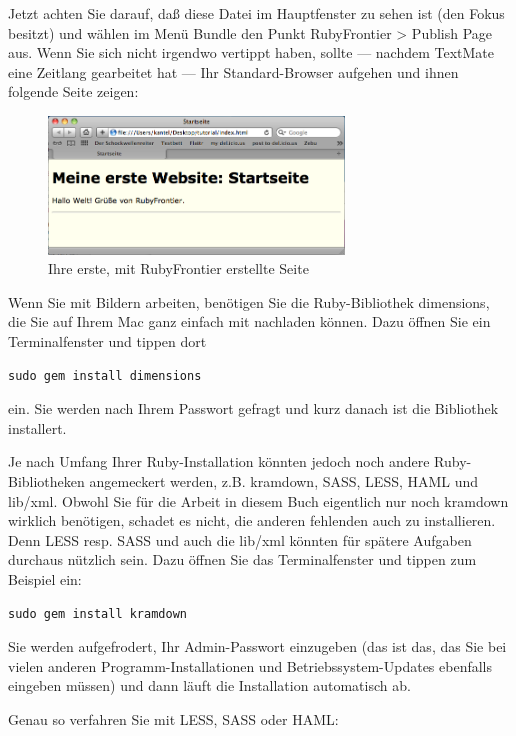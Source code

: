 \documentclass[11pt]{report}
\begin{document}
Jetzt achten Sie darauf, daß diese Datei im Hauptfenster zu sehen ist
(den Fokus besitzt) und wählen im Menü Bundle den Punkt RubyFrontier >
Publish Page aus. Wenn Sie sich nicht irgendwo vertippt haben, sollte
— nachdem TextMate eine Zeitlang gearbeitet hat — Ihr Standard-Browser
aufgehen und ihnen folgende Seite zeigen:

\begin{figure}[h!]
\centering
\includegraphics[width=0.7\textwidth]{./images/index.png}
\caption{\label{index01}Ihre erste, mit RubyFrontier erstellte Seite}
\end{figure}


Wenn Sie mit Bildern arbeiten, benötigen Sie die Ruby-Bibliothek
dimensions, die Sie auf Ihrem Mac ganz einfach mit nachladen
können. Dazu öffnen Sie ein Terminalfenster und tippen dort


\begin{verbatim}
sudo gem install dimensions
\end{verbatim}

ein. Sie werden nach Ihrem Passwort gefragt und kurz danach ist die
Bibliothek installert.


Je nach Umfang Ihrer Ruby-Installation könnten jedoch noch andere
Ruby-Bibliotheken angemeckert werden, z.B. kramdown, SASS, LESS, HAML
und lib/xml. Obwohl Sie für die Arbeit in diesem Buch eigentlich nur
noch kramdown wirklich benötigen, schadet es nicht, die anderen
fehlenden auch zu installieren. Denn LESS resp. SASS und auch die
lib/xml könnten für spätere Aufgaben durchaus nützlich sein. Dazu
öffnen Sie das Terminalfenster und tippen zum Beispiel ein:


\begin{verbatim}
sudo gem install kramdown
\end{verbatim}

Sie werden aufgefrodert, Ihr Admin-Passwort einzugeben (das ist das,
das Sie bei vielen anderen Programm-Installationen und
Betriebssystem-Updates ebenfalls eingeben müssen) und dann läuft die
Installation automatisch ab.


Genau so verfahren Sie mit LESS, SASS oder HAML:
\end{document}

